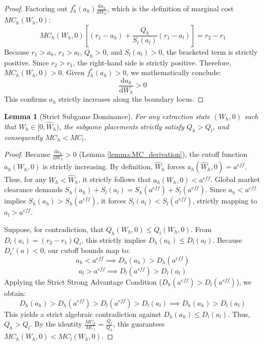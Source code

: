 \documentclass[12pt, a4paper]{article}
\newtheorem{lemma}{Lemma}
\begin{document}
\begin{proof}
Factoring out $f_h^*(a_h) \frac{\mathrm{d}a_h}{\mathrm{d}W_h}$, which is the definition of marginal cost $MC_h(W_h, 0)$:
\begin{equation}
    MC_h(W_h, 0) \left[ (r_1 - a_h) + \frac{Q_h}{S_l(a_l)} (r_1 - a_l) \right] = r_2 - r_1
\end{equation}
Because $r_1 > a_h$, $r_1 > a_l$, $Q_h > 0$, and $S_l(a_l) > 0$, the bracketed term is strictly positive. Since $r_2 > r_1$, the right-hand side is strictly positive. Therefore, $MC_h(W_h, 0) > 0$. 
Given $f_h^*(a_h) > 0$, we mathematically conclude:
\begin{equation}
    \frac{\mathrm{d}a_h}{\mathrm{d}W_h} > 0
\end{equation}
This confirms $a_h$ strictly increases along the boundary locus.
\end{proof}

\begin{lemma}[Strict Subgame Dominance]
\label{lemma:Qcomparison}
For any extraction state $(W_h, 0)$ such that $W_h \in [0, \hat{W}_h)$, the subgame placements strictly satisfy $Q_h > Q_l$, and consequently $MC_h < MC_l$.
\end{lemma}

\begin{proof}
Because $\frac{\mathrm{d}a_h}{\mathrm{d}W_h} > 0$ (Lemma \ref{lemma:MC_derivation}), the cutoff function $a_h(W_h, 0)$ is strictly increasing. 
By definition, $\hat{W}_h$ forces $a_h(\hat{W}_h, 0) = a^{eff}$. Thus, for any $W_h < \hat{W}_h$, it strictly follows that $a_h(W_h, 0) < a^{eff}$.
Global market clearance demands $S_h(a_h) + S_l(a_l) = S_h(a^{eff}) + S_l(a^{eff})$. Since $a_h < a^{eff}$ implies $S_h(a_h) > S_h(a^{eff})$, it forces $S_l(a_l) < S_l(a^{eff})$, strictly mapping to $a_l > a^{eff}$.

Suppose, for contradiction, that $Q_h(W_h, 0) \le Q_l(W_h, 0)$. 
From $D_i(a_i) = (r_2 - r_1)Q_i$, this strictly implies $D_h(a_h) \le D_l(a_l)$.
Because $D_i'(a) < 0$, our cutoff bounds map to:
$$ a_h < a^{eff} \implies D_h(a_h) > D_h(a^{eff}) $$
$$ a_l > a^{eff} \implies D_l(a^{eff}) > D_l(a_l) $$
Applying the Strict Strong Advantage Condition ($D_h(a^{eff}) > D_l(a^{eff})$), we obtain:
$$ D_h(a_h) > D_h(a^{eff}) > D_l(a^{eff}) > D_l(a_l) \implies D_h(a_h) > D_l(a_l) $$
This yields a strict algebraic contradiction against $D_h(a_h) \le D_l(a_l)$. Thus, $Q_h > Q_l$. By the identity $\frac{MC_h}{MC_l} = \frac{Q_l}{Q_h}$, this guarantees $MC_h(W_h, 0) < MC_l(W_h, 0)$.
\end{proof}
\end{document}
